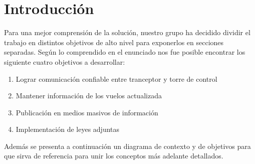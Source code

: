 \section{Introducción}
Para una mejor comprensión de la solución, nuestro grupo ha decidido dividir el trabajo en distintos objetivos de alto nivel para exponerlos en secciones separadas. Según lo comprendido en el enunciado nos fue posible encontrar los siguiente cuatro objetivos a desarrollar:
\begin{enumerate}
  \item Lograr comunicación confiable entre tranceptor y torre de control
  \item Mantener información de los vuelos actualizada
  \item Publicación en medios masivos de información
  \item Implementación de leyes adjuntas
\end{enumerate}
Además se presenta a continuación un diagrama de contexto y de objetivos para que sirva de referencia para unir los conceptos más adelante detallados.

